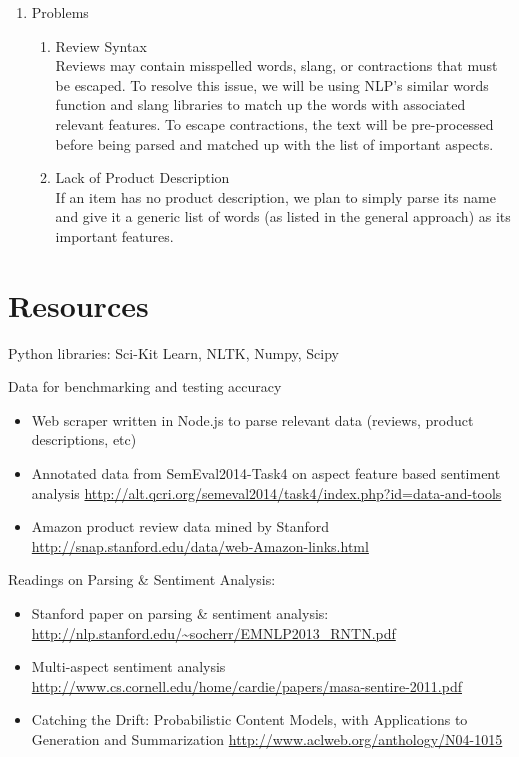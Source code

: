 \documentclass{article}
\begin{document}
\begin{enumerate}
\item Problems 
	\begin{enumerate} [label* = \arabic*.]
	\item Review Syntax \\
	Reviews may contain misspelled words, slang, or contractions that must be escaped. To resolve this issue, we will be using NLP's similar words function and slang libraries to match up the words with associated relevant features. To escape contractions, the text will be pre-processed before being parsed and matched up with the list of important aspects.
	\item Lack of Product Description \\
	If an item has no product description, we plan to simply parse its name and give it a generic list of words (as listed in the general approach) as its important features.
	\end{enumerate}
\end{enumerate}

\section{Resources}

Python libraries: Sci-Kit Learn, NLTK, Numpy, Scipy

Data for benchmarking and testing accuracy

\begin{itemize}
\item Web scraper written in Node.js to parse relevant data (reviews, product descriptions, etc)
\newline 

\item Annotated data from SemEval2014-Task4 on aspect feature based sentiment analysis
\newline
\url{http://alt.qcri.org/semeval2014/task4/index.php?id=data-and-tools}

\item Amazon product review data mined by Stanford
\newline
\url{http://snap.stanford.edu/data/web-Amazon-links.html}
\end{itemize}

Readings on Parsing \& Sentiment Analysis:
\begin{itemize}
\item Stanford paper on parsing \& sentiment analysis:
\newline
\url{http://nlp.stanford.edu/~socherr/EMNLP2013_RNTN.pdf}

\item Multi-aspect sentiment analysis
\newline 
\url{http://www.cs.cornell.edu/home/cardie/papers/masa-sentire-2011.pdf}

\item Catching the Drift: Probabilistic Content Models, with Applications to
Generation and Summarization \newline
\url{http://www.aclweb.org/anthology/N04-1015}
\end{itemize}
\end{document}
